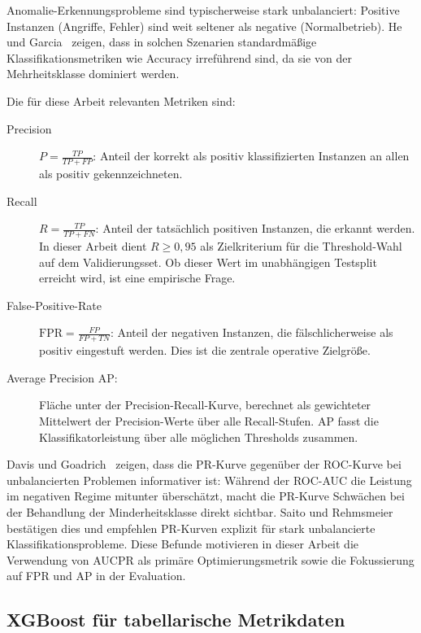 Anomalie-Erkennungsprobleme sind typischerweise stark unbalanciert: Positive
Instanzen (Angriffe, Fehler) sind weit seltener als negative (Normalbetrieb).
He und Garcia~\cite{hegarcia2009learning} zeigen, dass in solchen Szenarien
standardmäßige Klassifikationsmetriken wie Accuracy irreführend sind, da sie
von der Mehrheitsklasse dominiert werden.

Die für diese Arbeit relevanten Metriken sind:

\begin{description}
  \item[Precision] $P = \frac{TP}{TP + FP}$: Anteil der korrekt als positiv
    klassifizierten Instanzen an allen als positiv gekennzeichneten.
  \item[Recall] $R = \frac{TP}{TP + FN}$: Anteil der tatsächlich positiven
    Instanzen, die erkannt werden. In dieser Arbeit dient $R \geq 0{,}95$ als
    Zielkriterium für die Threshold-Wahl auf dem Validierungsset. Ob dieser Wert
    im unabhängigen Testsplit erreicht wird, ist eine empirische Frage.
  \item[False-Positive-Rate] $\text{FPR} = \frac{FP}{FP + TN}$: Anteil der
    negativen Instanzen, die fälschlicherweise als positiv eingestuft werden.
    Dies ist die zentrale operative Zielgröße.
  \item[Average Precision AP:] Fläche unter der Precision-Recall-Kurve,
    berechnet als gewichteter Mittelwert der Precision-Werte über alle
    Recall-Stufen. AP fasst die Klassifikatorleistung über alle möglichen
    Thresholds zusammen.
\end{description}

Davis und Goadrich~\cite{davis2006relationship} zeigen, dass die PR-Kurve
gegenüber der ROC-Kurve bei
unbalancierten Problemen informativer ist: Während der ROC-AUC die Leistung im negativen
Regime mitunter überschätzt, macht die PR-Kurve Schwächen bei der Behandlung der
Minderheitsklasse direkt sichtbar. Saito und
Rehmsmeier~\cite{saito2015precision} bestätigen dies und empfehlen PR-Kurven
explizit für stark unbalancierte Klassifikationsprobleme. Diese Befunde motivieren
in dieser Arbeit die Verwendung von AUCPR als
primäre Optimierungsmetrik sowie die Fokussierung auf FPR und AP in der Evaluation.

\subsection{XGBoost für tabellarische Metrikdaten}

